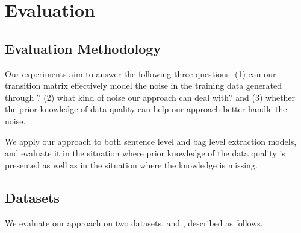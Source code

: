 \section{Evaluation}

\subsection{Evaluation Methodology}
Our experiments aim to answer the following three questions: (1) can our
transition matrix effectively model the noise in the training data generated
through \DS? (2) what kind of noise our approach can deal with? and (3)
whether the prior knowledge of data quality can help our approach better
handle the noise.

We apply our approach to both sentence level and bag level
extraction models, and evaluate it in the situation where prior knowledge of
the data quality is presented as well as in the situation where the 
knowledge is missing.


\subsection{Datasets}
We evaluate our approach on two datasets, \TimeRE and \EntityRE, described as follows.

